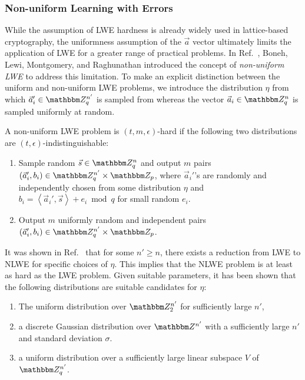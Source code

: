 \subsubsection{Non-uniform Learning with Errors}
While the assumption of LWE hardness is already widely used in lattice-based cryptography, the uniformness assumption of the $\vec{a}$ vector ultimately limits the application of LWE for a greater range of practical problems.
In Ref.~\cite{boneh2013key}, Boneh, Lewi, Montgomery, and Raghunathan introduced the concept of \emph{non-uniform LWE} to address this limitation.
To make an explicit distinction between the uniform and non-uniform LWE problems, we introduce the distribution $\eta$ from which $\vec{a}_i' \in \Z_q^{n'}$ is sampled from whereas the vector $\vec{a}_i \in \Z_q^n$ is sampled uniformly at random. 

\begin{definition}
	A non-uniform LWE problem is $(t, m, \epsilon)$-hard if the following two distributions are $(t, \epsilon)$-indistinguishable:
	\begin{enumerate}
		\item Sample random $\vec{s} \in \Z_q^n$ and output $m$ pairs $\left(\vec{a}_i', b_i\right) \in \Z_q^{n'} \times \Z_p$, where $\vec{a}_i'$'s are randomly and independently chosen from some distribution $\eta$ and $b_i = \left\langle \vec{a}_i', \vec{s}\right\rangle + e_i \bmod q$ for small random $e_i$.
		\item Output $m$ uniformly random and independent pairs $\left(\vec{a}_i', b_i\right) \in \Z_q^{n'} \times \Z_p$.
	\end{enumerate}
\end{definition}

It was shown in Ref.~\cite{boneh2013key} that for some $n' \geq n$, there exists a reduction from LWE to NLWE for specific choices of $\eta$.
This implies that the NLWE problem is at least as hard as the LWE problem.
Given suitable parameters, it has been shown that the following distributions are suitable candidates for $\eta$:
\begin{enumerate}
	\item The uniform distribution over $\Z_2^{n'}$ for sufficiently large $n'$,
	\item a discrete Gaussian distribution over $\Z^{n'}$ with a sufficiently large $n'$ and standard deviation $\sigma$.
	\item a uniform distribution over a sufficiently large linear subspace $V$ of $\Z_q^{n'}$.
\end{enumerate}



